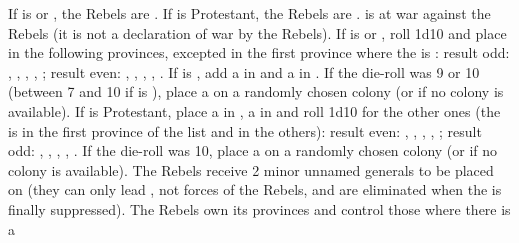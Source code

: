 \begin{digressions}

  \phevnt
  \aparag If \FRA is \CATHCR or \CATHCO, the Rebels are \hug.  If \FRA is
  Protestant, the Rebels are \lig. \FRA is at war against the Rebels (it is
  not a declaration of war by the Rebels).
  \aparag If \FRA is \CATHCR or \CATHCO, roll 1d10 and place \REVOLT
  \facemoins in the following provinces, excepted in the first province where
  the \REVOLT is \faceplus:
  \bparag result odd: \provincePoitou, \provinceQuercy, \provinceGuyenne,
  \provinceLanguedoc, \provinceAuvergne;
  \bparag result even: \provinceCaux, \provincePoitou, \provinceGuyenne,
  \provinceTouraine, \provinceVendee.
  \aparag If \FRA is \CATHCR, add a \REVOLT \faceplus in \provinceDauphine and
  a \REVOLT \facemoins in \provinceArmor.
  \aparag If the die-roll was 9 or 10 (between 7 and 10 if \FRA is \CATHCR),
  place a \REVOLT \facemoins on a randomly chosen colony (or \TP if no colony
  is available).
  \aparag If \FRA is Protestant, place a \REVOLT \faceplus in
  , a \REVOLT \facemoins in \provinceLyonnais and roll
  1d10 for the other ones (the \REVOLT is \faceplus in the first province of
  the list and \facemoins in the others):
  \bparag result even: \provinceProvence, \provinceNormandie, \provinceMaine,
  \provinceTroyes, \provinceVendee;
  \bparag result odd: \provinceOrleanais, \provinceChampagne,
  \provinceTouraine, \provinceCaux, \provincePicardie.
  \aparag If the die-roll was 10, place a \REVOLT \facemoins on a randomly
  chosen colony (or \TP if no colony is available).
  \aparag The Rebels receive 2 minor unnamed generals to be placed on \REVOLT
  (they can only lead \REVOLT , not forces of the Rebels, and are eliminated
  when the \REVOLT is finally suppressed).
  \aparag The Rebels own its provinces and control those where there is a
  \REVOLT\faceplus %




\end{digressions}
